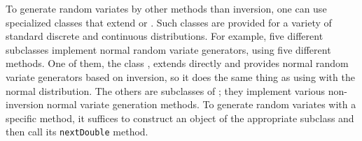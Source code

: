 
To generate random variates by other methods than inversion,
one can use specialized classes that extend
or .
Such classes are provided for a variety of standard discrete and
continuous distributions.
For example, five different subclasses implement normal random variate generators,
using five different methods.
One of them, the class
,
extends 
directly and provides normal random variate generators based on inversion,
so it does the same thing as using
with the normal distribution.
The others are subclasses of
;
they implement various non-inversion normal variate generation methods.
To generate random variates with a specific method, it suffices to
construct an object of the appropriate subclass and then call its
\texttt{nextDouble} method.



%

